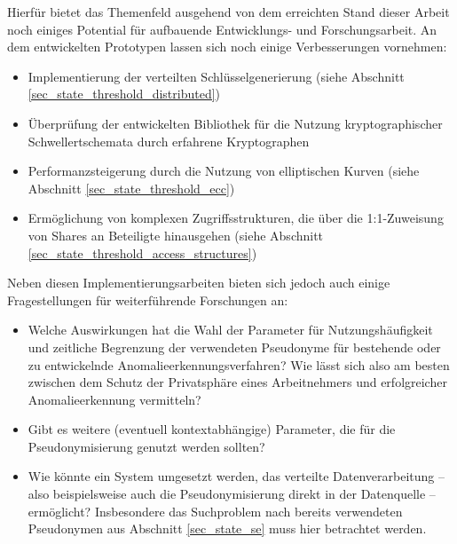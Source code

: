 %

Hierfür bietet das Themenfeld ausgehend von dem erreichten Stand dieser Arbeit noch einiges Potential für aufbauende Entwicklungs- und Forschungsarbeit. An dem entwickelten Prototypen lassen sich noch einige Verbesserungen vornehmen:

\begin{itemize}
  \item Implementierung der verteilten Schlüsselgenerierung (siehe Abschnitt \ref{sec_state_threshold_distributed})
  \item Überprüfung der entwickelten Bibliothek für die Nutzung kryptographischer Schwellertschemata durch erfahrene Kryptographen
  \item Performanzsteigerung durch die Nutzung von elliptischen Kurven (siehe Abschnitt \ref{sec_state_threshold_ecc})
  \item Ermöglichung von komplexen Zugriffsstrukturen, die über die 1:1-Zuweisung von Shares an Beteiligte hinausgehen (siehe Abschnitt \ref{sec_state_threshold_access_structures})
\end{itemize}

Neben diesen Implementierungsarbeiten bieten sich jedoch auch einige Fragestellungen für weiterführende Forschungen an:

\begin{itemize}
  \item Welche Auswirkungen hat die Wahl der Parameter für Nutzungshäufigkeit und zeitliche Begrenzung der verwendeten Pseudonyme für bestehende oder zu entwickelnde Anomalieerkennungsverfahren? Wie lässt sich also am besten zwischen dem Schutz der Privatsphäre eines Arbeitnehmers und erfolgreicher Anomalieerkennung vermitteln?
  \item Gibt es weitere (eventuell kontextabhängige) Parameter, die für die Pseudonymisierung genutzt werden sollten?
  \item Wie könnte ein System umgesetzt werden, das verteilte Datenverarbeitung -- also beispielsweise auch die Pseudonymisierung direkt in der Datenquelle -- ermöglicht? Insbesondere das Suchproblem nach bereits verwendeten Pseudonymen aus Abschnitt \ref{sec_state_se} muss hier betrachtet werden.
\end{itemize}


